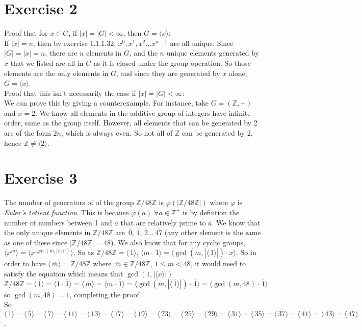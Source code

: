 \documentclass{article}
\newcommand{\Z}{\mathbb{Z}}
\newcommand{\olsi}[1]{\,\overline{\!{#1}}}
\begin{document}
    
    \section*{Exercise 2}
    Proof that for $x \in G$, if $|x| = |G| < \infty$,
    then $G = \langle x \rangle:$ \\
    If $|x| = n$,
    then by exercise 1.1.1.32,
    $x^0, x^1, x^2 \dots x^{n-1}$ are all unique.
    Since $|G| = |x| = n$,
    there are $n$ elements in $G$,
    and the $n$ unique elements generated by $x$ that we listed
    are all in $G$ as it is closed under the group operation.
    So those elements are the only elements in $G$,
    and since they are generated by $x$ alone, 
    $G = \langle x \rangle$. \\
    Proof that this isn't necessarily the case if $|x| = |G| < \infty$: \\
    We can prove this by giving a counterexample.
    For instance, take $G = (\Z, +)$ and $x = 2$.
    We know all elements in the additive group of integers have
    infinite order,
    same as the group itself.
    However, all elements that can be generated by 2 are of the form $2n$,
    which is always even.
    So not all of $\Z$ can be generated by 2,
    hence $\Z \neq \langle 2 \rangle$.


    \section*{Exercise 3}
    The number of generators of of the group $\Z/48\Z$
    is $\varphi(|\Z/48\Z|)$ where $\varphi$
    is \textit{Euler's totient function}.
    This is because $\varphi(a) \; \forall a \in \Z^+$
    is by defintion the number of numbers between 1 and $a$
    that are relatively prime to $a$.
    We know that the only unique elements in $\Z/48\Z$
    are $\olsi{0}, \olsi{1}, \olsi{2} \dots \olsi{47}$
    (any other element is the same as one of these since $|\Z/48\Z| = 48$).
    We also know that for any cyclic groups,
    $\langle x^m \rangle = \langle x^{\gcd(m, |\langle x \rangle|)} \rangle$,
    So as $\Z/48\Z = \langle \olsi{1} \rangle$,
    $\langle m \cdot \olsi{1} \rangle
    = \langle \gcd(m, |\langle \olsi{1} \rangle|) \cdot x \rangle$.
    So in order to have $\langle \olsi{m} \rangle = \Z/48\Z$
    where $\olsi{m} \in \Z/48\Z$, $1 \leqslant m < 48$,
    it would need to satisfy the equation
    which means that $\gcd(1, |\langle x \rangle|)$
    \[ \Z/48\Z = \langle \olsi{1} \rangle
    =  \langle 1 \cdot \olsi{1} \rangle
    =  \langle \olsi{m} \rangle
    =  \langle m \cdot \olsi{1} \rangle
    =  \langle \gcd(m, |\langle \olsi{1} \rangle|) \cdot \olsi{1} \rangle
    =  \langle \gcd(m, 48) \cdot \olsi{1} \rangle \]
    so $\gcd(m, 48) = 1$,
    completing the proof. \\
    So $\langle \olsi{1} \rangle
    = \langle \olsi{5} \rangle = \langle \olsi{7} \rangle
    = \langle \olsi{11} \rangle = \langle \olsi{13} \rangle
    = \langle \olsi{17} \rangle = \langle \olsi{19} \rangle
    = \langle \olsi{23} \rangle = \langle \olsi{25} \rangle
    = \langle \olsi{29} \rangle = \langle \olsi{31} \rangle
    = \langle \olsi{35} \rangle = \langle \olsi{37} \rangle
    = \langle \olsi{41} \rangle = \langle \olsi{43} \rangle
    = \langle \olsi{47} \rangle$.
\end{document}
